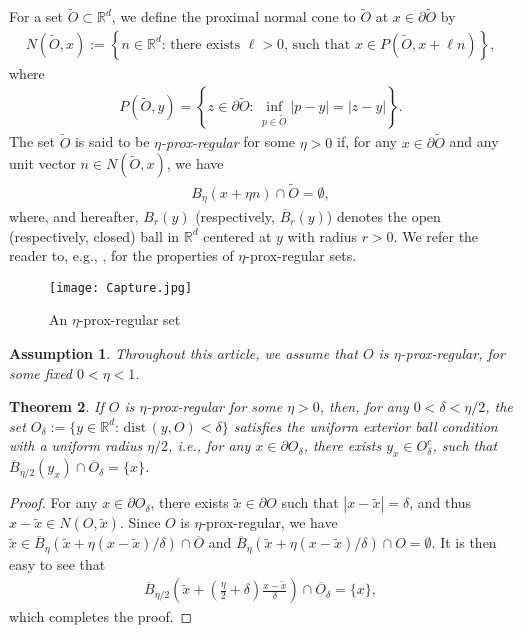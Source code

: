 \documentclass[amscd,amssymb,11pt]{article}
\newtheorem{theorem}{Theorem}
\newtheorem{assumption}[theorem]{Assumption}
\numberwithin{theorem}{section}
\numberwithin{equation}{section}
\begin{document}
For a set $\widetilde{O}\subset\mathbb{R}^{d}$, we define the proximal normal cone to $\widetilde{O}$ at $x\in\partial\widetilde{O}$ by
\begin{align*}
N(\widetilde{O},x):=\left\{n\in\mathbb{R}^{d}:\,\text{there exists $\ell>0$, such that }x\in P(\widetilde{O},x+\ell n)\right\},
\end{align*}
where
\begin{align*}
P(\widetilde{O},y)=\left\{z\in\partial\widetilde{O}:\,\inf_{p\in\widetilde{O}}|p-y|=|z-y|\right\}.
\end{align*}
The set $\widetilde{O}$ is said to be \emph{$\eta$-prox-regular} for some $\eta>0$ if, for any $x\in\partial\widetilde{O}$ and any unit vector $n\in N(\widetilde{O},x)$, we have
\begin{align*}
B_{\eta}(x+\eta n)\cap\widetilde{O}=\emptyset,
\end{align*}
where, and hereafter, $B_{r}(y)$ (respectively, $\overline{B}_{r}(y)$) denotes the open (respectively, closed) ball in $\mathbb{R}^{d}$ centered at $y$ with radius $r>0$. We refer the reader to, e.g., \cite{Bounkhel:2012,ClarkeLedyaevSternWolenski:1998,ClarkeSternWolenski:1995,PoliquinRockafellarThibault:2000}, for the properties of $\eta$-prox-regular sets.
\begin{figure}%
\centering
\texttt{[image: Capture.jpg]}\\
\caption{\scriptsize{An $\eta$-prox-regular set}}
\end{figure}

\begin{assumption}\label{assump:Domain O}
Throughout this article, we assume that $O$ is $\eta$-prox-regular, for some fixed $0<\eta<1$.
\end{assumption}
\begin{theorem}\label{thm:proxdomain}
If $O$ is $\eta$-prox-regular for some $\eta>0$, then, for any $0<\delta<\eta/2$, the set $O_{\delta}:=\{y\in\mathbb{R}^{d}:\,\text{dist}\,(y,O)<\delta\}$ satisfies the uniform exterior ball condition with a uniform radius $\eta/2$, i.e., for any $x\in\partial O_{\delta}$, there exists $y_{x}\in O_{\delta}^{c}$, such that $\overline{B}_{\eta/2}(y_{x})\cap\overline{O}_{\delta}=\{x\}$.
\end{theorem}
\begin{proof}
For any $x\in\partial O_{\delta}$, there exists $\tilde{x}\in\partial O$ such that $|x-\tilde{x}|=\delta$, and thus $x-\tilde{x}\in N(O,\tilde{x})$. Since $O$ is $\eta$-prox-regular, we have $\tilde{x}\in\overline{B}_{\eta}(\tilde{x}+\eta(x-\tilde{x})/\delta)\cap\overline{O}$ and $\overline{B}_{\eta}(\tilde{x}+\eta(x-\tilde{x})/\delta)\cap O=\emptyset$. It is then easy to see that
\begin{align*}
\overline{B}_{\eta/2}\left(\tilde{x}+\left(\frac{\eta}{2}+\delta\right)\frac{x-\tilde x}{\delta}\right)\cap\overline{O}_{\delta}=\{x\},
\end{align*}
which completes the proof.
\end{proof}
\end{document}

